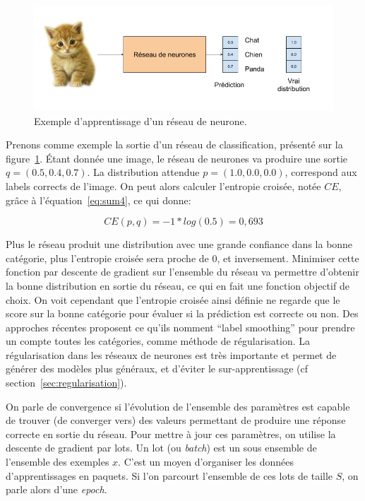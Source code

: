 \begin{figure}%
\includegraphics[width=\columnwidth]{figures/Apprentissage.png}%
\caption{Exemple d'apprentissage d'un réseau de neurone.}%
\label{fig:learning}%
\end{figure}

Prenons comme exemple la sortie d'un réseau de classification, présenté sur la figure~\ref{fig:learning}.
\'Etant donnée une image, le réseau de neurones va produire une sortie $q = (0.5, 0.4, 0.7)$. 
La distribution attendue $p = (1.0, 0.0, 0.0)$, correspond aux labels corrects de l'image.
On peut alors calculer l'entropie croisée, notée $CE$, grâce à l'équation~\ref{eq:sum4}, ce qui donne:

\begin{equation}
	CE(p,q) = -1*log(0.5) = 0,693 
\label{eq:crossapplied}
\end{equation}


Plus le réseau produit une distribution avec une grande confiance dans la bonne catégorie, plus l'entropie croisée sera proche de 0, et inversement.
Minimiser cette fonction par descente de gradient sur l'ensemble du réseau va permettre d'obtenir la bonne distribution en sortie du réseau, ce qui en fait une fonction objectif de choix.
On voit cependant que l'entropie croisée ainsi définie ne regarde que le score sur la bonne catégorie pour évaluer si la prédiction est correcte ou non.
Des approches récentes proposent ce qu'ils nomment ``label smoothing'' pour prendre un compte toutes les catégories, comme méthode de régularisation.
La régularisation dans les réseaux de neurones est très importante et permet de générer des modèles plus généraux, et d'éviter le sur-apprentissage (cf section~\ref{sec:regularisation}).

On parle de convergence si l'évolution de l'ensemble des paramètres est capable de trouver (de converger vers) des valeurs permettant de produire une réponse correcte en sortie du réseau.
Pour mettre à jour ces paramètres, on utilise la descente de gradient par lots.
Un lot (ou \textit{batch}) est un sous ensemble de l'ensemble des exemples $x$. 
C'est un moyen d'organiser les données d'apprentissages en paquets. 
Si l'on parcourt l'ensemble de ces lots de taille $S$, on parle alors d'une \textit{epoch}. 

